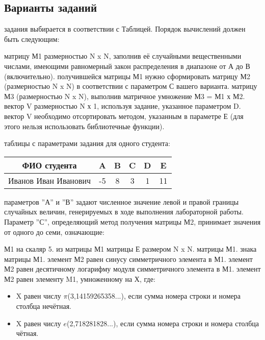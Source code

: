 { %
	\subsection{Варианты заданий}
	\Large{} задания выбирается в соответствии с Таблицей. Порядок вычислений должен быть следующим:
	\begin{enumerate}
		 матрицу М1 размерностью N x N, заполнив её случайными вещественными числами, имеющими равномерный закон распределения в диапазоне от А до В (включительно).
		 получившейся матрицы М1 нужно сформировать матрицу М2 (размерностью N x N) в соответствии с параметром С вашего варианта. 
		 матрицу М3 (размерностью N x N), выполнив матричное умножение М3 = М1 х М2. 
		 вектор V размерностью N х 1, используя задание, указанное параметром D. 
		 вектор V необходимо отсортировать методом, указанным в параметре Е (для этого нельзя использовать библиотечные функции).
	\end{enumerate}
	 таблицы с параметрами задания для одного студента:
	\begin{center}
		\begin{tabular}{|c|c|c|c|c|c|}
		\hline
		\textbf{ФИО студента} & \textbf{A} & \textbf{B} & \textbf{C} & \textbf{D} & \textbf{E} \\
		\hline
		Иванов Иван Иванович  & -5         & 8          & 3          & 1          & 11         \\
		\hline
		\end{tabular}
	\end{center}
	 параметров ''А'' и ''В'' задают численное значение левой и правой границы случайных величин, генерируемых в ходе выполнения лабораторной работы. 	Параметр ''С'', определяющий метод получения матрицы М2, принимает значения от одного до семи, означающие:
	\begin{enumerate}
		 М1 на скаляр 5.
		 из матрицы М1 матрицы Е размером N x N.
		 матрицы М1.
		 знака матрицы М1.
		 элемент М2 равен синусу симметричного элемента в М1.
		 элемент М2 равен десятичному логарифму модуля симметричного элемента в М1.
		 элемент М2 равен элементу M1, умноженному на Х, где:
			\begin{itemize}
				\item X равен числу $\pi$(3,14159265358...), если сумма номера строки и номера столбца нечётная.
				\item X равен числу $e$(2,718281828...), если сумма номера строки и номера столбца чётная.

\end{itemize}
\end{enumerate}}

